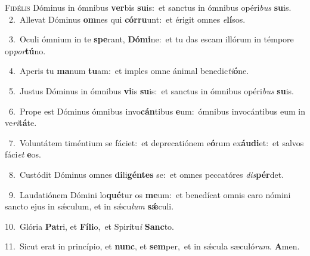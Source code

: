\lettrine{\initial\textcolor{\initialcolor}{F}}{idélis} Dóminus in ómnibus \textbf{ver}\-bis \textbf{su}\-is:~\star et sanctus in ómnibus opéri\textit{bus} \textbf{su}\-is.\\
{\numbfont\textcolor{\numbcolor}{~2.}}~Allevat Dóminus \textbf{om}\-nes qui \textbf{cór}\-\textbf{ru}unt:~\star et érigit omnes \textit{e}\-\textbf{lí}sos.\par
{\numbfont\textcolor{\numbcolor}{~3.}}~Oculi ómnium in te \textbf{spe}\-rant, \textbf{Dó}\-\textbf{mi}ne:~\star et tu das escam illórum in témpore op\-\textit{por}\-\textbf{tú}no.\par
{\numbfont\textcolor{\numbcolor}{~4.}}~Aperis tu \textbf{ma}\-num \textbf{tu}\-am:~\star et imples omne ánimal benedic\-\textit{ti}\-\textbf{ó}ne.\par
{\numbfont\textcolor{\numbcolor}{~5.}}~Justus Dóminus in ómnibus \textbf{vi}\-is \textbf{su}\-is:~\star et sanctus in ómnibus opéri\textit{bus} \textbf{su}\-is.\par
{\numbfont\textcolor{\numbcolor}{~6.}}~Prope est Dóminus ómnibus invo\-\textbf{cán}\-tibus \textbf{e}\-um:~\star ómnibus invocántibus eum in ve\-\textit{ri}\-\textbf{tá}te.\par
{\numbfont\textcolor{\numbcolor}{~7.}}~Voluntátem timéntium se fáciet:~\dagger et deprecatiónem e\-\textbf{ó}\-rum ex\-\textbf{áu}\-\textbf{di}et:~\star et salvos fáci\textit{et} \textbf{e}\-os.\par
{\numbfont\textcolor{\numbcolor}{~8.}}~Custódit Dóminus omnes \textbf{di}\-li\-\textbf{gén}\-\textbf{tes} se:~\star et omnes peccatóres \textit{dis}\-\textbf{pér}det.\par
{\numbfont\textcolor{\numbcolor}{~9.}}~Laudatiónem Dómini lo\-\textbf{qué}\-tur os \textbf{me}\-um:~\star et benedícat omnis caro nómini sancto ejus in sǽculum, et in sǽcu\textit{lum} \textbf{sǽ}\-culi.\par
{\numbfont\textcolor{\numbcolor}{10.}}~Glória \textbf{Pa}\-tri, et \textbf{Fí}\-\textbf{li}o,~\star et Spirítu\textit{i} \textbf{Sanc}\-to.\par
{\numbfont\textcolor{\numbcolor}{11.}}~Sicut erat in princípio, et \textbf{nunc}\-, et \textbf{sem}\-per,~\star et in sǽcula sæculó\-\textit{rum}\-. \textbf{A}\-men.\par
